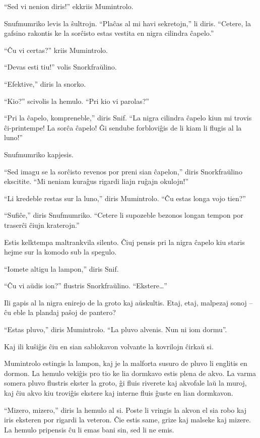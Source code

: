 ``Sed vi nenion diris!'' ekkriis Mumintrolo.

Snufmumriko levis la ŝultrojn. ``Plaĉas al mi havi sekretojn,'' li diris. ``Cetere, la gafsino rakontis ke la sorĉisto estas vestita en nigra cilindra ĉapelo.''

``Ĉu vi certas?'' kriis Mumintrolo.

``Devas esti tiu!'' volis Snorkfraŭlino.

``Efektive,'' diris la snorko.

``Kio?'' scivolis la hemulo. ``Pri kio vi parolas?''

``Pri la ĉapelo, kompreneble,'' diris Snif. ``La nigra cilindra ĉapelo kiun mi trovis ĉi-printempe! La sorĉa ĉapelo! Ĝi sendube forbloviĝis de li kiam li flugis al la luno!''

Snufmumriko kapjesis.

``Sed imagu se la sorĉisto revenos por preni sian ĉapelon,'' diris Snorkfraŭlino ekscitite. ``Mi neniam kuraĝus rigardi liajn ruĝajn okulojn!''

``Li kredeble restas sur la luno,'' diris Mumintrolo. ``Ĉu estas longa vojo tien?''

``Sufiĉe,'' diris Snufmumriko. ``Cetere li supozeble bezonos longan tempon por traserĉi ĉiujn kraterojn.''

Estis kelktempa maltrankvila silento. Ĉiuj pensis pri la nigra ĉapelo kiu staris hejme sur la komodo sub la spegulo.

``Iomete altigu la lampon,'' diris Snif.

``Ĉu vi aŭdis ion?'' flustris Snorkfraŭlino. ``Ekstere{\ldots}''

Ili gapis al la nigra enirejo de la groto kaj aŭskultis. Etaj, etaj, malpezaj sonoj -- ĉu eble la plandaj paŝoj de pantero?

``Estas pluvo,'' diris Mumintrolo. ``La pluvo alvenis. Nun ni iom dormu''.

Kaj ili kuŝiĝis ĉiu en sian sablokavon volvante la kovrilojn ĉirkaŭ si.

Mumintrolo estingis la lampon, kaj je la malforta susuro de pluvo li englitis en dormon.
\sectionbreak
La hemulo vekiĝis pro tio ke lia dormkavo estis plena de akvo. La varma somera pluvo flustris ekster la groto, ĝi fluis riverete kaj akvofale laŭ la muroj, kaj ĉiu akvo kiu troviĝis ekstere kaj interne fluis ĝuste en lian dormkavon.

``Mizero, mizero,'' diris la hemulo al si. Poste li vringis la akvon el sia robo kaj iris eksteren por rigardi la veteron. Ĉie estis same, grize kaj malseke kaj mizere. La hemulo pripensis ĉu li emas bani sin, sed li ne emis.

